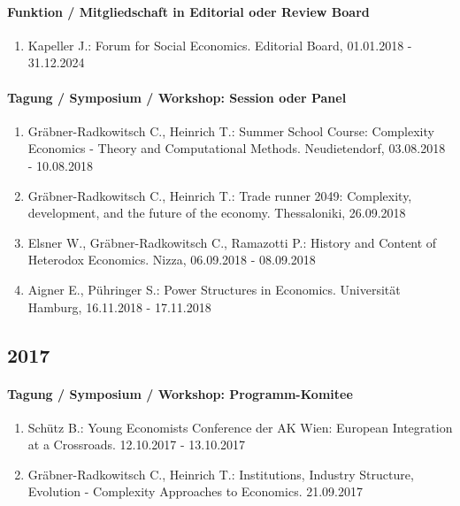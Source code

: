 \paragraph{Funktion / Mitgliedschaft in Editorial oder Review Board}
\begin{enumerate}[leftmargin=*, labelsep=0.5cm]
\item Kapeller J.: Forum for Social Economics. Editorial Board, 01.01.2018 - 31.12.2024
\end{enumerate}
\paragraph{Tagung / Symposium / Workshop: Session oder Panel}
\begin{enumerate}[leftmargin=*, labelsep=0.5cm]
\item Gräbner-Radkowitsch C., Heinrich T.: Summer School Course: Complexity Economics - Theory and Computational Methods. Neudietendorf, 03.08.2018 - 10.08.2018
\item Gräbner-Radkowitsch C., Heinrich T.: Trade runner 2049: Complexity, development, and the future of the economy. Thessaloniki, 26.09.2018
\item Elsner W., Gräbner-Radkowitsch C., Ramazotti P.: History and Content of Heterodox Economics. Nizza, 06.09.2018 - 08.09.2018
\item Aigner E., Pühringer S.: Power Structures in Economics. Universität Hamburg, 16.11.2018 - 17.11.2018
\end{enumerate}\subsection*{2017}\paragraph{Tagung / Symposium / Workshop: Programm-Komitee}
\begin{enumerate}[leftmargin=*, labelsep=0.5cm]
\item Schütz B.: Young Economists Conference der AK Wien: European Integration at a Crossroads. 12.10.2017 - 13.10.2017
\item Gräbner-Radkowitsch C., Heinrich T.: Institutions, Industry Structure, Evolution - Complexity Approaches to Economics. 21.09.2017
\end{enumerate}

